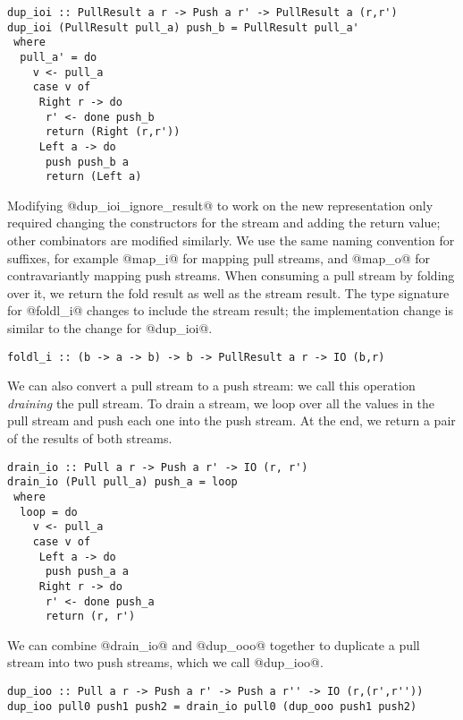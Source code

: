 \begin{lstlisting}
dup_ioi :: PullResult a r -> Push a r' -> PullResult a (r,r')
dup_ioi (PullResult pull_a) push_b = PullResult pull_a'
 where
  pull_a' = do
    v <- pull_a
    case v of
     Right r -> do
      r' <- done push_b
      return (Right (r,r'))
     Left a -> do
      push push_b a
      return (Left a)
\end{lstlisting}

Modifying @dup_ioi_ignore_result@ to work on the new representation only required changing the constructors for the stream and adding the return value; other combinators are modified similarly.
We use the same naming convention for suffixes, for example @map_i@ for mapping pull streams, and @map_o@ for contravariantly mapping push streams.
When consuming a pull stream by folding over it, we return the fold result as well as the stream result.
The type signature for @foldl_i@ changes to include the stream result; the implementation change is similar to the change for @dup_ioi@.

\begin{lstlisting}
foldl_i :: (b -> a -> b) -> b -> PullResult a r -> IO (b,r)
\end{lstlisting}

We can also convert a pull stream to a push stream: we call this operation \emph{draining} the pull stream.
To drain a stream, we loop over all the values in the pull stream and push each one into the push stream.
At the end, we return a pair of the results of both streams.

\begin{lstlisting}
drain_io :: Pull a r -> Push a r' -> IO (r, r')
drain_io (Pull pull_a) push_a = loop
 where
  loop = do
    v <- pull_a
    case v of
     Left a -> do
      push push_a a
     Right r -> do
      r' <- done push_a
      return (r, r')
\end{lstlisting}

We can combine @drain_io@ and @dup_ooo@ together to duplicate a pull stream into two push streams, which we call @dup_ioo@.

\begin{lstlisting}
dup_ioo :: Pull a r -> Push a r' -> Push a r'' -> IO (r,(r',r''))
dup_ioo pull0 push1 push2 = drain_io pull0 (dup_ooo push1 push2)
\end{lstlisting}

